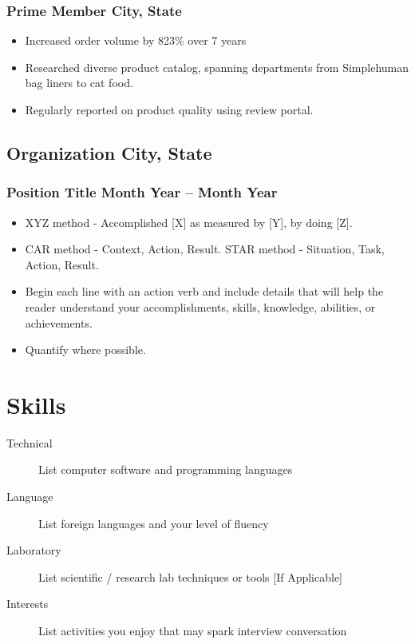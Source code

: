 \documentclass{article}
\begin{document}
\subsubsection{Prime Member \hfill City, State}
\begin{itemize}
    \item Increased order volume by 823\% over 7 years 
    \item Researched diverse product catalog, spanning departments from Simplehuman bag liners to cat food. 
    \item Regularly reported on product quality using review portal.
\end{itemize}

\subsection{Organization \hfill City, State}
\subsubsection{Position Title \hfill Month Year – Month Year}
\begin{itemize}
    \item XYZ method - Accomplished [X] as measured by [Y], by doing [Z].
    \item CAR method - Context, Action, Result. STAR method - Situation, Task, Action, Result.
    \item Begin each line with an action verb and include details that will help the reader understand your accomplishments, skills, knowledge, abilities, or achievements.
    \item Quantify where possible.
\end{itemize}

\section{Skills}
\begin{description}
    \item[Technical] List computer software and programming languages 
    \item[Language] List foreign languages and your level of fluency
    \item[Laboratory] List scientific / research lab techniques or tools [If Applicable]
    \item[Interests] List activities you enjoy that may spark interview conversation
\end{description}
\end{document}
